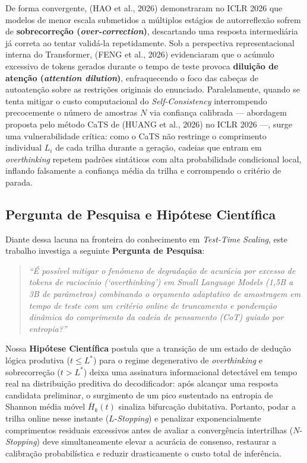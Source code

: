 \documentclass[9pt,conference]{IEEEtran}
\begin{document}
De forma convergente, (HAO et al., 2026) demonstraram no ICLR 2026 que modelos de menor escala submetidos a m\'{u}ltiplos est\'{a}gios de autorreflex\~{a}o sofrem de \textbf{sobrecorre\c{c}\~{a}o (\textit{over-correction})}, descartando uma resposta intermedi\'{a}ria j\'{a} correta ao tentar valid\'{a}-la repetidamente. Sob a perspectiva representacional interna do Transformer, (FENG et al., 2026) evidenciaram que o ac\'{u}mulo excessivo de tokens gerados durante o tempo de teste provoca \textbf{dilui\c{c}\~{a}o de aten\c{c}\~{a}o (\textit{attention dilution})}, enfraquecendo o foco das cabe\c{c}as de autoaten\c{c}\~{a}o sobre as restri\c{c}\~{o}es originais do enunciado. Paralelamente, quando se tenta mitigar o custo computacional do \textit{Self-Consistency} interrompendo precocemente o n\'{u}mero de amostras $N$ via confian\c{c}a calibrada --- abordagem proposta pelo m\'{e}todo CaTS de (HUANG et al., 2026) no ICLR 2026 ---, surge uma vulnerabilidade cr\'{i}tica: como o CaTS n\~{a}o restringe o comprimento individual $L_i$ de cada trilha durante a gera\c{c}\~{a}o, cadeias que entram em \textit{overthinking} repetem padr\~{o}es sint\'{a}ticos com alta probabilidade condicional local, inflando falsamente a confian\c{c}a m\'{e}dia da trilha e corrompendo o crit\'{e}rio de parada.

\subsection{Pergunta de Pesquisa e Hip\'{o}tese Cient\'{i}fica}

Diante dessa lacuna na fronteira do conhecimento em \textit{Test-Time Scaling}, este trabalho investiga a seguinte \textbf{Pergunta de Pesquisa}:

\begin{quote}
\textit{``\'{E} poss\'{i}vel mitigar o fen\^{o}meno de degrada\c{c}\~{a}o de acur\'{a}cia por excesso de tokens de racioc\'{i}nio (`overthinking') em Small Language Models (1,5B a 3B de par\^{a}metros) combinando o or\c{c}amento adaptativo de amostragem em tempo de teste com um crit\'{e}rio online de truncamento e pondera\c{c}\~{a}o din\^{a}mica do comprimento da cadeia de pensamento (CoT) guiado por entropia?''}
\end{quote}

Nossa \textbf{Hip\'{o}tese Cient\'{i}fica} postula que a transi\c{c}\~{a}o de um estado de dedu\c{c}\~{a}o l\'{o}gica produtiva ($t \le L^*$) para o regime degenerativo de \textit{overthinking} e sobrecorre\c{c}\~{a}o ($t > L^*$) deixa uma assinatura informacional detect\'{a}vel em tempo real na distribui\c{c}\~{a}o preditiva do decodificador: ap\'{o}s alcan\c{c}ar uma resposta candidata preliminar, o surgimento de um pico sustentado na entropia de Shannon m\'{e}dia m\'{o}vel $\bar{H}_k(t)$ sinaliza bifurca\c{c}\~{a}o dubitativa. Portanto, podar a trilha online nesse instante ($L$-\textit{Stopping}) e penalizar exponencialmente comprimentos residuais excessivos antes de avaliar a converg\^{e}ncia intertrilhas ($N$-\textit{Stopping}) deve simultaneamente elevar a acur\'{a}cia de consenso, restaurar a calibra\c{c}\~{a}o probabil\'{i}stica e reduzir drasticamente o custo total de infer\^{e}ncia.
\end{document}
